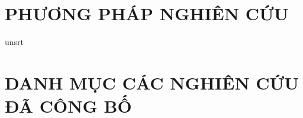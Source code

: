 \documentclass[a4paper,12pt,oneside]{report}
\begin{document}
\chapter{\centering PHƯƠNG PHÁP NGHIÊN CỨU}


% 

% 



{unsrt}




\chapter*{\centering DANH MỤC CÁC NGHIÊN CỨU ĐÃ CÔNG BỐ}

\end{document}
